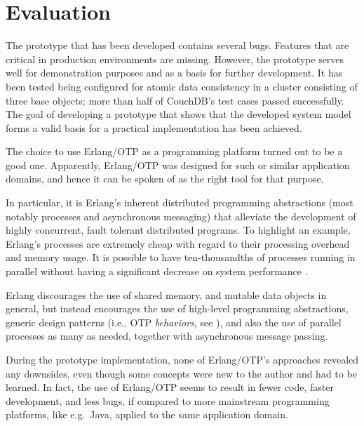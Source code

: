 \section{Evaluation}

The prototype that has been developed contains several bugs. Features that are critical in production environments are missing. However, the prototype serves well for demonstration purposes and as a basis for further development. It has been tested being configured for atomic data consistency in a cluster consisting of three base objects; more than half of CouchDB's test cases passed successfully. The goal of developing a prototype that shows that the developed system model forms a valid basis for a practical implementation has been achieved.

The choice to use Erlang/OTP as a programming platform turned out to be a good one. Apparently, Erlang/OTP was designed for such or similar application domains, and hence it can be spoken of as the right tool for that purpose.

In particular, it is Erlang's inherent distributed programming abstractions (most notably processes and asynchronous messaging) that alleviate the development of highly concurrent, fault tolerant distributed programs. To highlight an example, Erlang's processes are extremely cheap with regard to their processing overhead and memory usage. It is possible to have ten-thousandths of processes running in parallel without having a significant decrease on system performance \cite[p.~148ff]{Arm07}.

Erlang discourages the use of shared memory, and mutable data objects in general, but instead encourages the use of high-level programming abstractions, generic design patterns (i.e., OTP \emph{behaviors}, see \cite{LMC10}), and also the use of parallel processes as many as needed, together with asynchronous message passing.

During the prototype implementation, none of Erlang/OTP's approaches revealed any downsides, even though some concepts were new to the author and had to be learned. In fact, the use of Erlang/OTP seems to result in fewer code, faster development, and less bugs, if compared to more mainstream programming platforms, like e.g.\ Java, applied to the same application domain.
